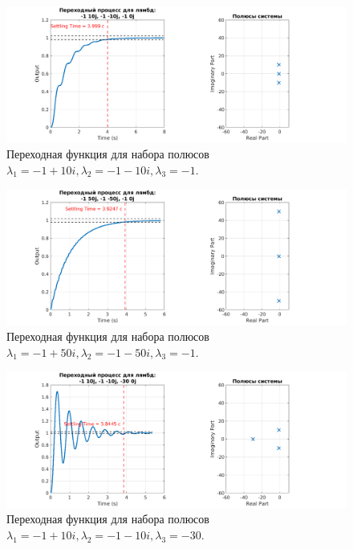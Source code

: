 \begin{figure}
    \centering
    \includegraphics[width=1\textwidth]{figs/task_2_out_6.png}
    \caption{Переходная функция для набора полюсов $\lambda_1 = -1+10i, \lambda_2 = -1 - 10i, \lambda_3 = -1$.}
    \label{fig:task_2_out_6}
\end{figure}

\begin{figure}
    \centering
    \includegraphics[width=1\textwidth]{figs/task_2_out_7.png}
    \caption{Переходная функция для набора полюсов $\lambda_1 = -1+50i, \lambda_2 = -1 - 50i, \lambda_3 = -1$.}
    \label{fig:task_2_out_7}
\end{figure}

\begin{figure}
    \centering
    \includegraphics[width=1\textwidth]{figs/task_2_out_8.png}
    \caption{Переходная функция для набора полюсов $\lambda_1 = -1+10i, \lambda_2 = -1 - 10i, \lambda_3 = -30$.}
    \label{fig:task_2_out_8}
\end{figure}

